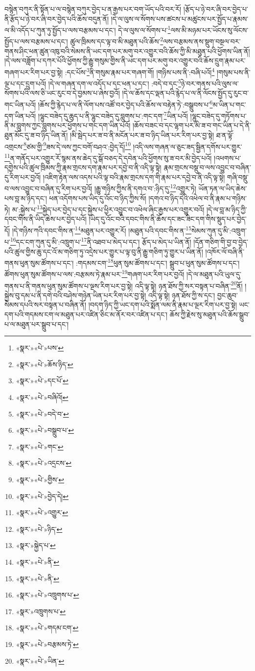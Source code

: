 བསྙེན་བཀུར་ནི་སྟོན་པ་ལ་བསྙེན་བཀུར་བྱེད་པ་ན་རྒྱས་པར་བག་ཡོད་པའི་བར་རོ། །རྩོད་པ་ཉེ་བར་ཞི་བར་བྱེད་པ་ནི་རྩོད་པ་ཉེ་བར་ཞི་བར་བྱེད་པའི་ཆོས་བདུན་ནོ། །དེ་ལ་ལུས་ལ་སོགས་པས་ཚངས་པ་མཚུངས་པར་སྤྱོད་པ་རྣམས་ལ་མི་འདོད་པ་ཀུན་ཏུ་སྤྱོད་པ་ལས་བརྩམས་པ་དང་། དེ་ལ་ལུས་ལ་སོགས་པ་\footnote{«སྣར་»«པེ་»པས་}ལས་མི་མཉམ་པར་ཡོངས་སུ་ལོངས་སྤྱོད་པ་ལས་བརྩམས་པ་དང་། ཚུལ་ཁྲིམས་དང་ལྟ་བ་མི་མཐུན་པའི་ཆོས་\footnote{«སྣར་»«པེ་»ཆོས་ཉིད་}ལས་བརྩམས་ནས་སྡུག་བསྔལ་བར་གནས་ཤིང་ཕན་ཚུན་འཁུ་བའི་སེམས་ནི་ཡང་དག་པར་མགུ་བར་འགྱུར་བའི་ཆོས་ཀྱི་མི་མཐུན་པའི་ཕྱོགས་ཡིན་ནོ། །དེ་ལས་བཟློག་པ་དཀར་པོའི་ཕྱོགས་ཀྱི་རྒྱུ་གསུམ་གྱིས་ནི་ཡང་དག་པར་མགུ་བར་འགྱུར་བའི་ཆོས་དྲུག་རྣམ་པར་གཞག་པར་རིག་པར་བྱ་སྟེ། :དང་པོས་\footnote{«སྣར་»«པེ་»དང་པོ་}ནི་གསུམ་རྣམ་པར་གཞག་གོ། །གཉིས་པས་ནི་:བཞི་པའོ།\footnote{«སྣར་»«པེ་»བཞིའོ།} །གསུམ་པས་ནི་ལྔ་པ་དང་དྲུག་པའོ། །དེ་ལ་གཞན་དག་ལ་འདོད་པ་དང་ཕན་པ་དང་། :བདེ་བ་དང་\footnote{«སྣར་»«པེ་»བདེ་བ་}ཉེ་བར་གནས་པའི་ལུས་ལ་སོགས་པའི་ལས་ཅི་ཡང་རུང་བ་དེ་བྱམས་པ་ཞེས་བྱའོ། །དེ་ལ་ཆོས་དང་ལྡན་པའི་རྙེད་པ་ལ་ནི་ལོངས་སྤྱོད་དུ་རུང་བ་གང་ཡིན་པའོ། །ཆོས་ཀྱི་རྙེད་པ་ལ་ནི་ལོག་པས་འཚོ་བར་བྱེད་པའི་ཆོས་ལ་བརྟེན་ཏེ་:བསྒྲུབས་པ་\footnote{«སྣར་»«པེ་»བསྒྲུབ་པ་}མ་ཡིན་པ་གང་དག་ཡིན་པའོ། །ལྷུང་བཟེད་དུ་ཆུད་པ་ནི་ལྷུང་བཟེད་དུ་བླུགས་པ་:གང་དག་\footnote{«སྣར་»«པེ་»གང་}ཡིན་པའོ། །ལྷུང་བཟེད་དུ་གཏོགས་པ་ནི་མ་བླུགས་ཀྱང་བླུགས་པར་ཕྱོགས་པ་གང་དག་ཡིན་པའོ། །ཆོས་བཟང་བ་དང་ལྷག་པར་མི་ཟ་བ་གང་ཡིན་པ་དེ་ནི་ཐུན་མོང་དུ་ཟ་བ་ཉིད་ཡིན་ནོ། །མི་སྦེད་པར་ཟ་བ་ནི་མངོན་པར་ཟ་བ་ཉིད་ཡིན་པར་རིག་པར་བྱ་སྟེ། ཐ་ན་ལྟོ་འགྲངས་\footnote{«སྣར་»«པེ་»འདྲངས་}ཙམ་གྱི་\footnote{«སྣར་»«པེ་»གྱིས་}ཟས་དེ་ལས་ཀྱང་བགོ་བཤའ་:བྱེད་དོ།\footnote{«སྣར་»«པེ་»བྱེད་དེ།} །འདི་ལས་གཞན་ལ་ཅུང་ཟད་སྦྱིན་དགོས་པར་གྱུར་\footnote{«སྣར་»«པེ་»འགྱུར་}ན་གནོད་པར་འགྱུར་རོ་སྙམ་ནས་ཆེད་དུ་སྒོ་བཅད་དེ་དབེན་པའི་ཕྱོགས་སུ་ཟ་བར་མི་བྱེད་པའོ། །འཕགས་པ་དགྱེས་པའི་ཚུལ་ཁྲིམས་ཀྱི་རྣམ་གྲངས་དག་རྣམ་པར་དབྱེ་བ་ནི་འདི་ལྟ་སྟེ། རྣམ་གྲངས་བསྡུ་བ་ལས་འབྱུང་བ་བཞིན་དུ་རིག་པར་བྱའོ། །འཇིག་རྟེན་ལས་འདས་པའི་ལྟ་བའི་རྣམ་གྲངས་དག་གི་རྣམ་པར་དབྱེ་བ་ནི་འདི་ལྟ་སྟེ། གཞི་བསྡུ་བ་ལས་འབྱུང་བ་བཞིན་དུ་རིག་པར་བྱའོ། །རྒྱུ་གཉིས་ཀྱིས་ནི་དགའ་བ་:ཉིད་དུ་\footnote{«སྣར་»«པེ་»ཉིད་}འགྱུར་ཏེ། ཡོན་ཏན་ལ་ཡིད་ཆེས་པས་བླ་མ་ཉིད་དང་། ཕན་འདོགས་པས་ཡིད་དུ་འོང་བ་ཉིད་ཀྱིས་སོ། །དགའ་བ་ཉིད་དེའི་འཕེལ་བ་ནི་རྣམ་པ་གཉིས་ཏེ། མ་:སྐྱེས་པ་\footnote{«སྣར་»སྐྱེད་པ་}སྐྱེད་པར་བྱེད་པ་དང་སྐྱེས་པ་ཕྱིར་འབྱུང་བ་འཕེལ་ཞིང་རྒྱས་པར་འགྱུར་བའོ། །དེ་ལ་བླ་མ་ཉིད་ཀྱི་དབང་གིས་ནི་ཡིད་ཆེས་པར་བྱེད་པའོ། །ཡིད་དུ་འོང་བའི་དབང་གིས་ནི་ཆོས་དང་ཟང་ཟིང་དག་གིས་སྡུད་པར་བྱེད་དོ། །དེ་གཉིས་ཀའི་དབང་གིས་ན་\footnote{«སྣར་»«པེ་»ནི་}མཐུན་པར་འགྱུར་རོ། །མཐུན་པའི་དབང་གིས་ན་\footnote{«སྣར་»«པེ་»ནི་}སེམས་ཀུན་དུ་མི་:འཁྲུག་པ་\footnote{«སྣར་»«པེ་»འཁྲུགས་པ་}དང་ངག་ཀུན་དུ་མི་:འཁྲུག་པ་\footnote{«སྣར་»འཁྲུགས་པ་}ནི་འཐབ་པ་མེད་པ་དང་། རྩོད་པ་མེད་པ་ཡིན་ནོ། །དོན་གཅིག་གི་བྱ་བ་བྱེད་པའི་ཚུལ་གྱིས་ཆུ་དང་འོ་མ་གཅིག་ཏུ་འདྲེས་པར་གྱུར་པ་ལྟ་བུ་ནི་རྒྱུ་གཅིག་ཏུ་གྱུར་པ་ཡིན་ནོ། །འཁོར་ལོ་བཞི་ནི་གནས་ཕུན་སུམ་ཚོགས་པ་དང་། :གདམས་ངག་\footnote{«སྣར་»«པེ་»གདམ་ངག་}ཕུན་སུམ་ཚོགས་པ་དང་། སྒྲུབ་པ་ཕུན་སུམ་ཚོགས་པ་དང་། ཚོགས་ཕུན་སུམ་ཚོགས་པ་ལས་:བརྩམས་ཏེ་རྣམ་པར་\footnote{«སྣར་»«པེ་»བརྩམས་ཏེ་}གཞག་པར་རིག་པར་བྱའོ། །དེ་ལ་མཐུན་པའི་ཡུལ་དུ་གནས་པ་ནི་གནས་ཕུན་སུམ་ཚོགས་པ་ལྔས་རིག་པར་བྱ་སྟེ། འདི་ལྟ་སྟེ། ཉན་ཐོས་ཀྱི་སར་བསྟན་པ་བཞིན་\footnote{«སྣར་»«པེ་»ཡིན་}ནོ། །སྐྱེས་བུ་དམ་པ་ནི་དགེ་བའི་བཤེས་གཉེན་ཡིན་པར་རིག་པར་བྱ་སྟེ། འདི་ལྟ་སྟེ། ཉན་ཐོས་ཀྱི་ས་དང་། བྱང་ཆུབ་སེམས་དཔའི་སར་བསྟན་པ་བཞིན་ནོ། །བདག་ཉིད་ཀྱི་ཡང་དག་པའི་སྨོན་ལམ་ནི་རྣམ་པ་ལྔར་རིག་པར་བྱ་སྟེ། ཡང་དག་པའི་གདམས་ངག་ལ་མཐུན་པར་འཛིན་ཅིང་མ་ནོར་བར་འཛིན་པ་དང་། ཆོས་ཀྱི་རྗེས་སུ་མཐུན་པའི་ཆོས་སྒྲུབ་པ་ལ་མཐུན་པར་སྒྲུབ་པ་དང་། 